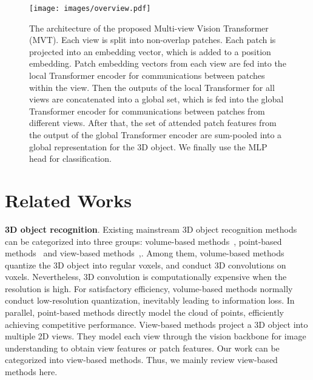 \documentclass{bmvc2k}
\begin{document}
\begin{figure}
     \centering
    \texttt{[image: images/overview.pdf]}
     \caption{
    The architecture of the proposed Multi-view Vision Transformer (MVT). Each view is split into non-overlap patches. Each patch is projected into an embedding vector,  which is added to a position embedding.   Patch embedding vectors from each view are fed into the local Transformer encoder for communications between patches within the view. Then the outputs of the local Transformer for all views are concatenated into a global set, which is fed into the global Transformer encoder for communications between patches from different views.  After that, the set of attended patch features from the output of the global Transformer encoder are sum-pooled into a global representation for the $3$D object.  We finally use the MLP head for classification.
     }
     \label{fig:overview}
\end{figure}

\section{Related Works}
\textbf{3D object recognition}. Existing mainstream 3D object recognition methods can be categorized into three groups:  volume-based methods~\cite{wu20153d,maturana2015voxnet,qi2016volumetric,meng2019vv}, point-based methods~\cite{pointnet,pointnet++,3Dmfv} and view-based methods~\cite{wang2017dominant,feng2018gvcnn,kanezaki2018rotationnet,DBLP:journals/tip/HanSLVLZHC19,DBLP:journals/tip/HanLLVLZHC19,Wei_2020_CVPR},. Among them, volume-based methods quantize the 3D object into regular voxels, and conduct  3D convolutions on voxels. Nevertheless, 3D convolution is computationally expensive when the resolution is high. For satisfactory efficiency,  volume-based methods  normally conduct low-resolution quantization, inevitably leading to information loss.
In parallel, point-based methods directly model the cloud of points, efficiently achieving competitive performance. View-based methods project a 3D object into multiple 2D views. They model each view through the vision backbone for image understanding to obtain view features or patch features. Our work can be categorized into view-based methods. Thus, we mainly review view-based methods here. 
\end{document}
